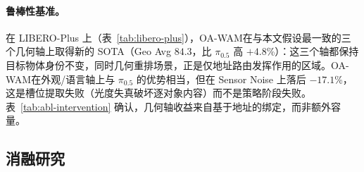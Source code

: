 \documentclass{article}
\newcommand{\method}{OA-WAM}
\begin{document}
\paragraph{鲁棒性基准。} 在 LIBERO-Plus 上（表~\ref{tab:libero-plus}），\method{}在与本文假设最一致的三个几何轴上取得新的 SOTA（Geo Avg $84.3$，比 $\pi_{0.5}$ 高 $+4.8$\%）：这三个轴都保持目标物体身份不变，同时几何重排场景，正是仅地址路由发挥作用的区域。\method{}在外观/语言轴上与 $\pi_{0.5}$ 的优势相当，但在 Sensor Noise 上落后 $-17.1$\%，这是槽位提取失败（光度失真破坏逐对象内容）而不是策略阶段失败。表~\ref{tab:abl-intervention} 确认，几何轴收益来自基于地址的绑定，而非额外容量。

\subsection{消融研究}
\label{sec:experiments:ablation}
\end{document}
